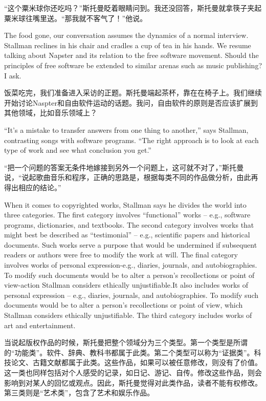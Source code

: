 \ifdefined\chs
``这个粟米球你还吃吗？''斯托曼眨着眼睛问到。我还没回答，斯托曼就拿筷子夹起粟米球往嘴里送。``那我就不客气了！''他说。
\fi

\ifdefined\eng
The food gone, our conversation assumes the dynamics of a normal interview. Stallman reclines in his chair and cradles a cup of tea in his hands. We resume talking about Napster and its relation to the free software movement. Should the principles of free software be extended to similar arenas such as music publishing? I ask.
\fi

\ifdefined\chs
饭菜吃完，我们准备进入采访的正题。斯托曼端起茶杯，靠在在椅子上。我们继续开始讨论Naspter和自由软件运动的话题。我问，自由软件的原则是否应该扩展到其他领域，比如音乐领域上？
\fi

\ifdefined\eng
``It's a mistake to transfer answers from one thing to another,'' says Stallman, contrasting songs with software programs. ``The right approach is to look at each type of work and see what conclusion you get.''
\fi

\ifdefined\chs
``把一个问题的答案无条件地嫁接到另外一个问题上，这可就不对了，''斯托曼说，``说起歌曲音乐和程序，正确的思路是，根据每类不同的作品做分析，由此再得出相应的结论。''
\fi

\ifdefined\eng
When it comes to copyrighted works, Stallman says he divides the world into three categories. The first category involves ``functional'' works -- e.g., software programs, dictionaries, and textbooks. The second category involves works that might best be described as ``testimonial'' -- e.g., scientific papers and historical documents. Such works serve a purpose that would be undermined if subsequent readers or authors were free to modify the work at will.  \ifdefined\vone The final category involves works of personal expression-e.g., diaries, journals, and autobiographies. To modify such documents would be to alter a person's recollections or point of view-action Stallman considers ethically unjustifiable.\fi\ifdefined\vtwo It also includes works of personal expression -- e.g., diaries, journals, and autobiographies. To modify such documents would be to alter a person's recollections or point of view, which Stallman considers ethically unjustifiable.  The third category includes works of art and entertainment.\fi
\fi

\ifdefined\chs
当说起版权作品的时候，斯托曼把整个领域分为三个类型。第一个类型是所谓的``功能类''。软件、辞典、教科书都属于此类。第二个类型可以称为``证据类''。科技论文、古籍文献都属于此类。这些作品，如果可以被任意修改，则没有了价值。这一类也同样包括对个人感受的记录，如日记、游记、自传。修改这些作品，则会影响到对某人的回忆或观点。因此，斯托曼觉得对此类作品，读者不能有权修改。第三类则是``艺术类''，包含了艺术和娱乐作品。
\fi

